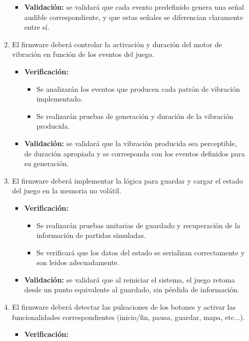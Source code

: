 \documentclass[
11pt, %
]{charter}
\begin{document}
\begin{enumerate}
\begin{enumerate}
\begin{itemize}
\begin{itemize}
			\end{itemize}
			\item \textbf{Validación:} se validará que cada evento predefinido genera una señal audible correspondiente, y que estas señales se diferencian claramente entre sí.
		\end{itemize}		
		\item El firmware deberá controlar la activación y duración del motor de vibración en función de los eventos del juego. %
		\begin{itemize}
			\item \textbf{Verificación:} 
			\begin{itemize}
				\item Se analizarán los eventos que producen cada patrón de vibración implementado.
				\item Se realizarán pruebas de generación y duración de la vibración producida.
			\end{itemize}
			\item \textbf{Validación:} se validará que la vibración producida sea perceptible, de duración apropiada y se corresponda con los eventos definidos para su generación.
		\end{itemize}		
		\item El firmware deberá implementar la lógica para guardar y cargar el estado del juego en la memoria no volátil. %
		\begin{itemize}
			\item \textbf{Verificación:} 
			\begin{itemize}
				\item Se realizarán pruebas unitarias de guardado y recuperación de la información de partidas simuladas.
				\item Se verificará que los datos del estado se serializan correctamente y son leídos adecuadamente.
			\end{itemize}
			\item \textbf{Validación:} se validará que al reiniciar el sistema, el juego retoma desde un punto equivalente al guardado, sin pérdida de información.
		\end{itemize}		
		\item El firmware deberá detectar las pulsaciones de los botones y activar las funcionalidades correspondientes (inicio/fin, pausa, guardar, mapa, etc...). %
		\begin{itemize}
			\item \textbf{Verificación:} 
			\begin{itemize}

\end{itemize}
\end{itemize}
\end{enumerate}
\end{enumerate}
\end{document}
